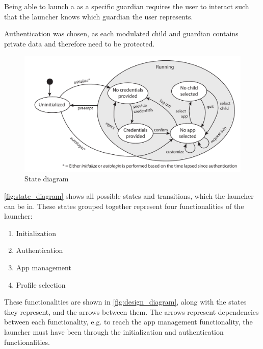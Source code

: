 Being able to launch a \girafapp[] as a specific guardian requires the user to interact such that the launcher knows which guardian the user represents.

Authentication was chosen, as each modulated child and guardian contains private data and therefore need to be protected.

\begin{figure}[h]
	\centering
	\includegraphics[width=1\textwidth]{gfx/statediagram.pdf}
	\caption{State diagram}
	\label{fig:state_diagram}
\end{figure}


\autoref{fig:state_diagram} shows all possible states and transitions, which the launcher can be in. 
These states grouped together represent four functionalities of the launcher:

\begin{enumerate}
	\item Initialization
	\item Authentication
	\item App management
	\item Profile selection
\end{enumerate}

These functionalities are shown in \autoref{fig:design_diagram}, along with the states they represent, and the arrows between them.
The arrows represent dependencies between each functionality, e.g. to reach the app management functionality, the launcher must have been through the initialization and authentication functionalities.

